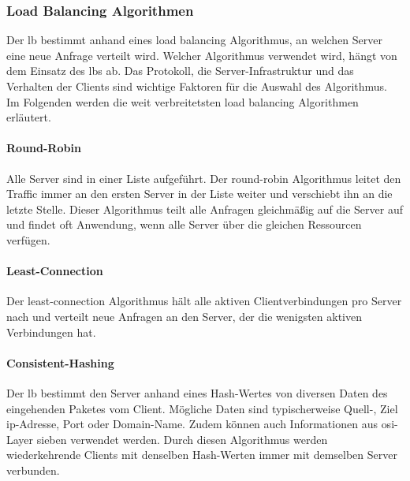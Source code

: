 \subsubsection{Load Balancing Algorithmen} \label{sb:lb-algo}
Der \acl{lb} bestimmt anhand eines load balancing Algorithmus, an welchen Server eine neue Anfrage verteilt wird.
Welcher Algorithmus verwendet wird, hängt von dem Einsatz des \aclp{lb} ab.
Das Protokoll, die Server-Infrastruktur und das Verhalten der Clients sind wichtige Faktoren für die Auswahl des Algorithmus.
\\
Im Folgenden werden die weit verbreitetsten load balancing Algorithmen erläutert.

\paragraph{Round-Robin}
Alle Server sind in einer Liste aufgeführt. Der round-robin Algorithmus leitet den Traffic immer an den ersten Server in der Liste weiter und verschiebt ihn an die letzte Stelle.
Dieser Algorithmus teilt alle Anfragen gleichmä{\ss}ig auf die Server auf und findet oft Anwendung, wenn alle Server über die gleichen Ressourcen verfügen.
\cite{WhatLoadBalancer}

\paragraph{Least-Connection}
Der least-connection Algorithmus hält alle aktiven Clientverbindungen pro Server nach und verteilt neue Anfragen an den Server, der die wenigsten aktiven Verbindungen hat.
\cite{WhatLoadBalancer}

\paragraph{Consistent-Hashing}
Der \ac{lb} bestimmt den Server anhand eines Hash-Wertes von diversen Daten des eingehenden Paketes vom Client.
Mögliche Daten sind typischerweise Quell-, Ziel \ac{ip}-Adresse, Port oder Domain-Name. Zudem können auch Informationen aus \ac{osi}-Layer sieben verwendet werden. Durch diesen Algorithmus werden wiederkehrende Clients mit denselben Hash-Werten immer mit demselben Server verbunden.
\cite{WhatLoadBalancer}

\newpage
